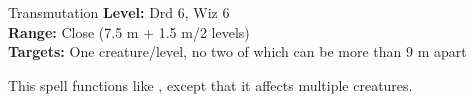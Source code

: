 {Transmutation}
{
	\textbf{Level:}
	Drd 6, Wiz 6\\
	\textbf{Range:}
	Close (7.5 m + 1.5 m/2 levels)\\
	\textbf{Targets:}
	One creature/level, no two of which can be more than 9 m apart\\
}
{
	This spell functions like , except that it affects multiple creatures.

}
